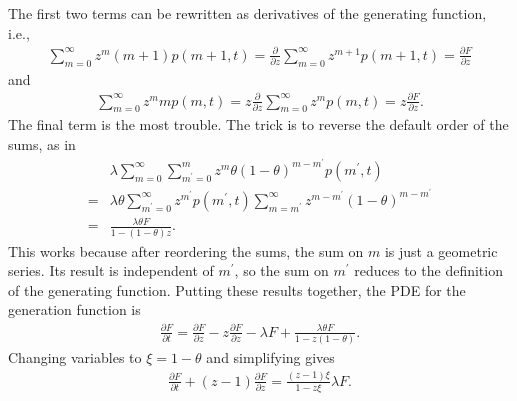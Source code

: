 \documentclass[12pt]{article}%
\newcommand{\pderiv}[2][{}]{\frac{\partial #1}{\partial #2}}
\begin{document}
The first two terms can be rewritten as derivatives of the
generating function, i.e.,
\begin{align}
\sum_{m=0}^\infty z^m (m+1)p(m+1,t)
=
\pderiv{z} \sum_{m=0}^\infty z^{m+1} p(m+1,t)
=
\pderiv[F]{z}
\end{align}
and
\begin{align}
\sum_{m=0}^\infty z^m mp(m,t)
=
z\pderiv{z} \sum_{m=0}^\infty z^m p(m,t)
=
z\pderiv[F]{z}.
\end{align}
The final term is the most trouble. The trick is to reverse
the default order of the sums, as in
\begin{align}
&\lambda \sum_{m=0}^\infty \sum_{m^\prime=0}^m
        z^m \theta(1 - \theta)^{m-m^\prime} p(m^\prime,t)
\\=
&\lambda\theta \sum_{m^\prime=0}^\infty z^{m^\prime} p(m^\prime,t)
        \sum_{m=m^\prime}^\infty
        z^{m-m^\prime} (1 - \theta)^{m-m^\prime}
\\=
&\frac{\lambda\theta F}{1 - (1 - \theta)z}.
\end{align}
This works because after reordering the sums, the sum on $m$ is just
a geometric series. Its result is independent of $m^\prime$, so the sum on
$m^\prime$ reduces to the definition of the generating function.
Putting these results together, the PDE for the generation function is
\begin{align}
\pderiv[F]{t} = \pderiv[F]{z} - z\pderiv[F]{z} - \lambda F
        + \frac{\lambda\theta F}{1-z(1-\theta)}.
\end{align}
Changing variables to $\xi=1-\theta$ and simplifying gives
\begin{align}
\pderiv[F]{t} + (z - 1) \pderiv[F]{z} = \frac{(z-1)\xi}{1-z\xi}\lambda F.
\label{eq:1state_unreg_015}
\end{align}
\end{document}
